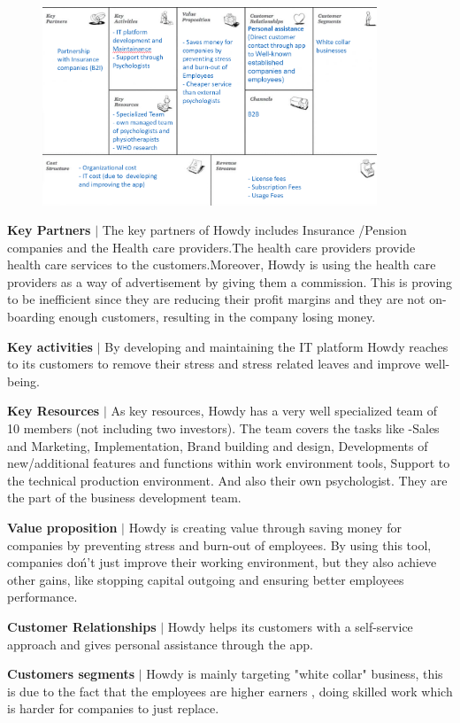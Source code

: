 \begin{figure}[H]
\includegraphics[width=10cm]{figures/BCDRAFT.png}
\centering
\end{figure}

\noindent \textbf{Key Partners} $|$ The key partners of Howdy includes Insurance /Pension companies and the Health care providers.The health care providers provide health care services to the customers.Moreover, Howdy is using the health care providers as a way of advertisement by giving them a commission. This is proving to be inefficient since they are reducing their profit margins and they are not on-boarding enough customers, resulting in the company losing money.

\noindent \textbf{Key activities} $|$ By developing and maintaining the IT platform Howdy reaches to its customers to remove their stress and stress related leaves and improve well-being.

\noindent \textbf{Key Resources} $|$ As key resources, Howdy has a very well specialized team of 10 members (not including two investors). The team covers the tasks like -Sales and Marketing, Implementation, Brand building and design, Developments of new/additional features and functions within work environment tools, Support to the technical production environment. And also their own psychologist. They are the part of the business development team.

\noindent \textbf{Value proposition} $|$ Howdy is creating value through saving money for companies by preventing stress and burn-out of employees. By using this tool, companies doń't just improve their working environment, but they also achieve other gains, like stopping capital outgoing and ensuring better employees performance.

\noindent \textbf{Customer Relationships} $|$ Howdy helps its customers with a self-service approach and gives personal assistance through the app.

\noindent \textbf{Customers segments} $|$ Howdy is mainly targeting "white collar" business, this is due to the fact that the employees are higher earners , doing skilled work which is harder for companies to just replace.

